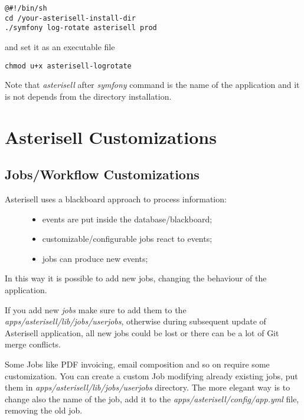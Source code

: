 \documentclass[letterpaper,10pt,english]{sphinxmanual}
\begin{document}
\begin{Verbatim}[commandchars=@\[\]]
@#!/bin/sh
cd /your-asterisell-install-dir
./symfony log-rotate asterisell prod
\end{Verbatim}

and set it as an executable file

\begin{Verbatim}[commandchars=@\[\]]
chmod u+x asterisell-logrotate
\end{Verbatim}

Note that \emph{asterisell} after \emph{symfony} command is the name of the application and it is not depends from the directory installation.


\section{Asterisell Customizations}
\label{index:asterisell-customizations}\label{index:id1}

\subsection{Jobs/Workflow Customizations}
\label{index:jobs-workflow-customizations}\begin{description}
\item[{Asterisell uses a blackboard approach to process information:}] \leavevmode\begin{itemize}
\item {} 
events are put inside the database/blackboard;

\item {} 
customizable/configurable jobs react to events;

\item {} 
jobs can produce new events;

\end{itemize}

\end{description}

In this way it is possible to add new jobs, changing the behaviour of the application.

If you add new \emph{jobs} make sure to add them to the \emph{apps/asterisell/lib/jobs/userjobs}, otherwise during subsequent update of Asterisell application, all new jobs could be lost or there can be a lot of Git merge conflicts.

Some Jobs like PDF invoicing, email composition and so on require some customization. You can create a custom Job modifying already existing jobs, put them in \emph{apps/asterisell/lib/jobs/userjobs} directory. The more elegant way is to change also the name of the job, add it to the \emph{apps/asterisell/config/app.yml} file, removing the old job.
\end{document}
